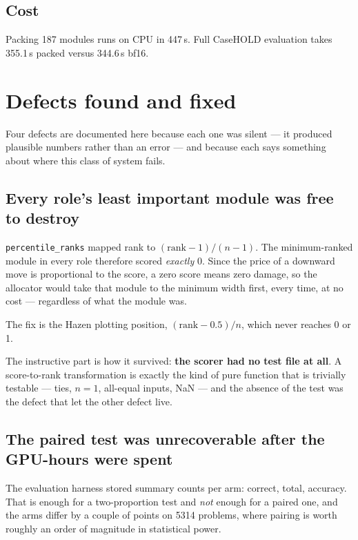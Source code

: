 \documentclass[11pt]{article}
\newcommand{\code}[1]{\texttt{#1}}
\begin{document}
\subsection{Cost}

Packing 187 modules runs on CPU in 447\,s. Full CaseHOLD evaluation takes 355.1\,s packed versus
344.6\,s bf16.

\section{Defects found and fixed}
\label{sec:defects}

Four defects are documented here because each one was silent --- it produced plausible numbers
rather than an error --- and because each says something about where this class of system fails.

\subsection{Every role's least important module was free to destroy}

\code{percentile\_ranks} mapped rank to $(\text{rank} - 1)/(n - 1)$. The minimum-ranked module in
every role therefore scored \emph{exactly} 0. Since the price of a downward move is proportional
to the score, a zero score means zero damage, so the allocator would take that module to the
minimum width first, every time, at no cost --- regardless of what the module was.

The fix is the Hazen plotting position, $(\text{rank} - 0.5)/n$, which never reaches 0 or 1.

The instructive part is how it survived: \textbf{the scorer had no test file at all}. A
score-to-rank transformation is exactly the kind of pure function that is trivially testable ---
ties, $n = 1$, all-equal inputs, NaN --- and the absence of the test was the defect that let the
other defect live.

\subsection{The paired test was unrecoverable after the GPU-hours were spent}

The evaluation harness stored summary counts per arm: correct, total, accuracy. That is enough
for a two-proportion test and \emph{not} enough for a paired one, and the arms differ by a couple
of points on 5314 problems, where pairing is worth roughly an order of magnitude in statistical
power.
\end{document}
